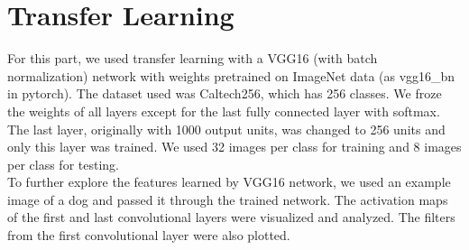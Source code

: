 \documentclass{article}
\begin{document}
\newpage
\section{Transfer Learning}
For this part, we used transfer learning with a VGG16 (with batch normalization) network with weights pretrained on ImageNet data (as vgg16\_bn in pytorch). The dataset used was Caltech256, which has 256 classes. We froze the weights of all layers except for the last fully connected layer with softmax. The last layer, originally with 1000 output units, was changed to 256 units and only this layer was trained. We used 32 images per class for training and 8 images per class for testing.\\
To further explore the features learned by VGG16 network, we used an example image of a dog and passed it through the trained network. The activation maps of the first and last convolutional layers were visualized and analyzed. The filters from the first convolutional layer were also plotted.\\
\end{document}
